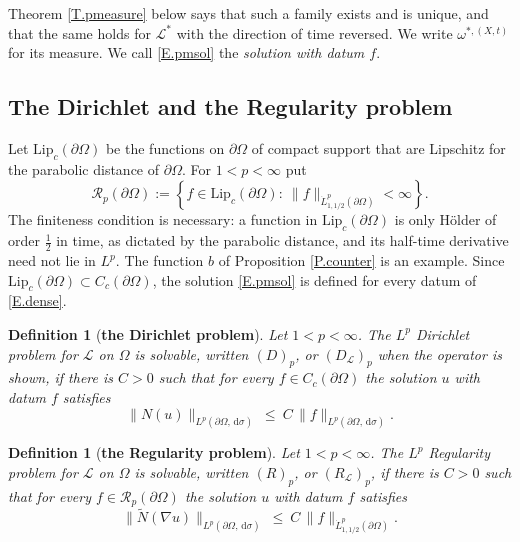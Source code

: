 \documentclass[10pt,a4paper]{amsart}
\numberwithin{equation}{section}
\newcommand{\set}[1]{\left\{#1\right\}}
\newcommand{\om}{\Omega}
\newcommand{\pom}{\partial\Omega}
\newcommand{\LL}{\mathcal L}
\newcommand{\Nt}{\widetilde N}
\renewcommand{\d}{\,\mathrm d}
\newcommand{\Lipc}{\mathrm{Lip}_c}
\newtheorem{definition}[equation]{Definition}
\begin{document}
\noindent Theorem \ref{T.pmeasure} below says that such a family exists and is
unique, and that the same holds for $\LL^*$ with the direction of time
reversed. We write $\omega^{*,(X,t)}$ for its measure. We call \eqref{E.pmsol}
the \emph{solution with datum $f$}.

\subsection{The Dirichlet and the Regularity problem}\label{ss.bvp}

Let $\Lipc(\pom)$ be the functions on $\pom$ of compact support that are
Lipschitz for the parabolic distance of $\pom$. For $1<p<\infty$ put
\begin{equation}\label{E.dense}
  \mathcal R_p(\pom):=\set{f\in\Lipc(\pom):\
   \|f\|_{\dot L^p_{1,1/2}(\pom)}<\infty} .
\end{equation}
The finiteness condition is necessary: a function in $\Lipc(\pom)$ is only
H\"older of order $\tfrac12$ in time, as dictated by the parabolic distance,
and its half-time derivative need not lie in $L^p$. The function $b$ of
Proposition \ref{P.counter} is an example.
Since $\Lipc(\pom)\subset C_c(\pom)$, the solution \eqref{E.pmsol} is defined
for every datum of \eqref{E.dense}.

\begin{definition}[\bf the Dirichlet problem]\label{D.Dp}
Let $1<p<\infty$. The $L^p$ Dirichlet problem for $\LL$ on $\om$ is
\emph{solvable}, written $(D)_p$, or $(D_\LL)_p$ when the operator is shown, if there is $C>0$ such that for every $f\in C_c(\pom)$ the solution
$u$ with datum $f$ satisfies
\begin{equation}\label{E.Dp}
  \big\|N(u)\big\|_{L^p(\pom,\d\sigma)}\ \le\
  C\,\|f\|_{L^p(\pom,\d\sigma)} .
\end{equation}
\end{definition}

\begin{definition}[\bf the Regularity problem]\label{D.Rp}
Let $1<p<\infty$. The $L^p$ Regularity problem for $\LL$ on $\om$ is
\emph{solvable}, written $(R)_p$, or $(R_\LL)_p$, if there is $C>0$ such that
for every $f\in\mathcal R_p(\pom)$ the solution $u$ with datum $f$ satisfies
\begin{equation}\label{E.Rp}
  \big\|\Nt(\nabla u)\big\|_{L^p(\pom,\d\sigma)}\ \le\
  C\,\|f\|_{\dot L^p_{1,1/2}(\pom)} .
\end{equation}
\end{definition}
\end{document}
